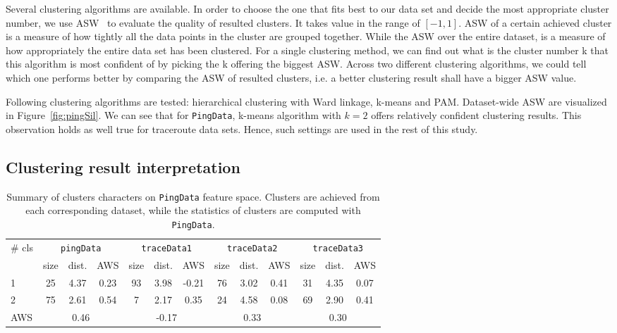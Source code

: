 Several clustering algorithms are available. 
In order to choose the one that fits best to our data set and decide the most appropriate cluster number, we use \acf{ASW}~\cite{Rousseeuw1987} to evaluate the quality of resulted clusters. 
It takes value in the range of $[-1,1]$. 
\ac{ASW} of a certain achieved cluster is a measure of how tightly all the data points in the cluster are grouped together. 
While the \ac{ASW} over the entire dataset, is a measure of how appropriately the entire data set has been clustered. For a single clustering method, we can find out what is the cluster number k that this algorithm is most confident of by picking the k offering the biggest \ac{ASW}. Across two different clustering algorithms, we could tell which one performs better by comparing the \ac{ASW} of resulted clusters, i.e. a better clustering result shall have a bigger \ac{ASW} value.

Following clustering algorithms are tested: hierarchical clustering with Ward linkage, k-means and \ac{PAM}.
Dataset-wide \ac{ASW} are visualized in Figure~\ref{fig:pingSil}. We can see that for \texttt{PingData}, k-means algorithm with $k=2$ offers relatively confident clustering results. 
This observation holds as well true for traceroute data sets.
Hence, such settings are used in the rest of this study.


\subsection{Clustering result interpretation}

\begin{table}[!htb]
\centering
\footnotesize
\setlength{\tabcolsep}{0.5em}
\begin{tabular}{l|ccc|ccc|ccc|ccc}
\toprule
\multirow{2}{*}{\# cls} & \multicolumn{3}{c|}{\texttt{pingData}} & \multicolumn{3}{c|}{\texttt{traceData1}} & \multicolumn{3}{c|}{\texttt{traceData2}} & \multicolumn{3}{c}{\texttt{traceData3}}\\
& size & dist. & AWS & size & dist. & AWS & size & dist. & AWS & size& dist. & AWS\\
\midrule
1 & 25 & 4.37 & 0.23 & 93 & 3.98 & -0.21 & 76 & 3.02 & 0.41 & 31 & 4.35 & 0.07\\
2 & 75 & 2.61 & 0.54 & 7  & 2.17 & 0.35  & 24 & 4.58 & 0.08 & 69 & 2.90 & 0.41\\ 
\midrule
AWS &\multicolumn{3}{c|}{0.46} & \multicolumn{3}{c|}{-0.17} & \multicolumn{3}{c|}{0.33} & \multicolumn{3}{c}{0.30}\\
\bottomrule
\end{tabular}
\caption{Summary of clusters characters on \texttt{PingData} feature space. Clusters are achieved from each corresponding dataset, while the statistics of clusters are computed with \texttt{PingData}.}
\label{tab:summary_cls}
\end{table}

